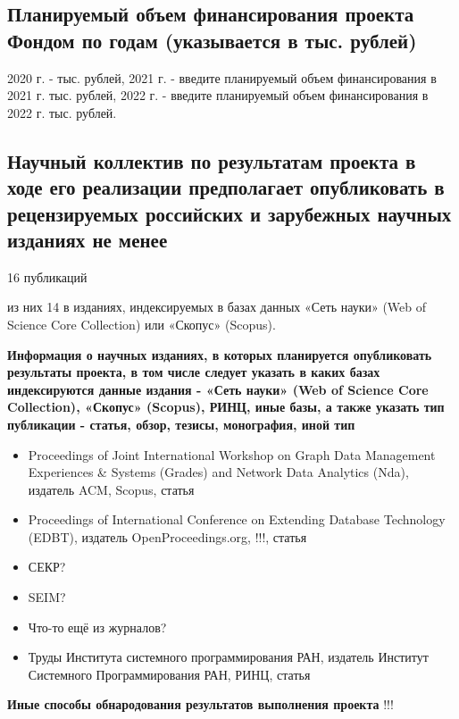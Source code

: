 \documentclass[12pt]{article}  %
\theoremstyle{remark}
\begin{document}
\subsection{Планируемый объем финансирования проекта Фондом по годам (указывается в тыс. рублей)}
2020 г. - тыс. рублей,
2021 г. - введите планируемый объем финансирования в 2021 г. тыс. рублей,
2022 г. - введите планируемый объем финансирования в 2022 г. тыс. рублей.

\subsection{Научный коллектив по результатам проекта в ходе его реализации предполагает опубликовать в рецензируемых российских и зарубежных научных изданиях не менее}

16 публикаций

из них 14 в изданиях, индексируемых в базах данных «Сеть науки» (Web of Science Core Collection) или «Скопус» (Scopus).

\textbf{Информация о научных изданиях, в которых планируется опубликовать результаты проекта, в том числе следует указать в каких базах индексируются данные издания - «Сеть науки» (Web of Science Core Collection), «Скопус» (Scopus), РИНЦ, иные базы, а также указать тип публикации - статья, обзор, тезисы, монография, иной тип}
\begin{itemize}
  \item Proceedings of Joint International Workshop on Graph Data Management Experiences \& Systems (Grades) and Network Data Analytics (Nda), издатель  ACM, Scopus, статья
  \item Proceedings of International Conference on Extending Database Technology (EDBT), издатель OpenProceedings.org, !!!, статья
  \item СЕКР?
  \item SEIM?
  \item Что-то ещё из журналов?
  \item Труды Института системного программирования РАН, издатель Институт Системного Программирования РАН, РИНЦ, статья
\end{itemize}

\textbf{Иные способы обнародования результатов выполнения проекта}
!!!
\end{document}
